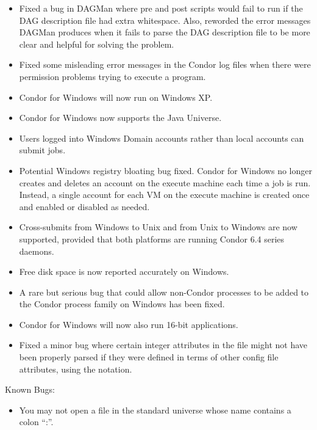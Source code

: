 \begin{itemize}
\item Fixed a bug in DAGMan where pre and post scripts would fail to
run if the DAG description file had extra whitespace.
Also, reworded the error messages DAGMan produces when it fails to
parse the DAG description file to be more clear and helpful for
solving the problem.

\item Fixed some misleading error messages in the Condor log files
when there were permission problems trying to execute a program. 

\item Condor for Windows will now run on Windows XP.

\item Condor for Windows now supports the Java Universe.

\item Users logged into Windows Domain accounts rather than local accounts
can submit jobs.

\item Potential Windows registry bloating bug fixed. Condor for Windows no
longer creates and deletes an account on the execute machine each time a
job is run. Instead, a single account for each VM on the execute machine is
created once and enabled or disabled as needed.

\item Cross-submits from Windows to Unix and from Unix to Windows are now
supported, provided that both platforms are running Condor 6.4 series daemons.

\item Free disk space is now reported accurately on Windows.

\item A rare but serious bug that could allow non-Condor processes to be added
to the Condor process family on Windows has been fixed.

\item Condor for Windows will now also run 16-bit applications.

\item Fixed a minor bug where certain integer attributes in the
 file might not have been properly parsed if they
were defined in terms of other config file attributes, using the
 notation.  

\end{itemize}

\noindent Known Bugs:
\begin{itemize}

\item You may not open a file in the standard universe whose name contains a
colon ``:''.

\end{itemize}

